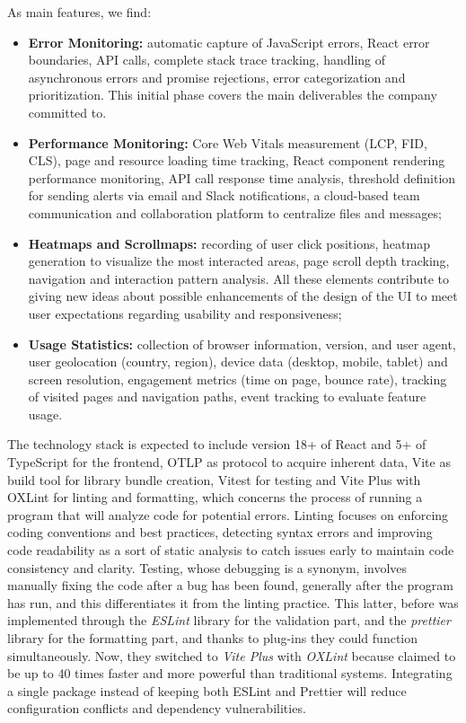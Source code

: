 \documentclass[12pt,a4paper,openright,twoside]{book}
\begin{document}
As main features, we find:
\begin{itemize}[nosep]
    \item \textbf{Error Monitoring:} automatic capture of JavaScript errors, React error boundaries, API calls, complete stack trace tracking, handling of asynchronous errors and promise rejections, error categorization and prioritization. This initial phase covers the main deliverables the company committed to.
    \item \textbf{Performance Monitoring:} Core Web Vitals measurement (LCP, FID, CLS), page and resource loading time tracking, React component rendering performance monitoring, API call response time analysis, threshold definition for sending alerts via email and Slack notifications, a cloud-based team communication and collaboration platform to centralize files and messages;
    \item \textbf{Heatmaps and Scrollmaps:} recording of user click positions, heatmap generation to visualize the most interacted areas, page scroll depth tracking, navigation and interaction pattern analysis. All these elements contribute to giving new ideas about possible enhancements of the design of the UI to meet user expectations regarding usability and responsiveness;
    \item \textbf{Usage Statistics:} collection of browser information, version, and user agent, user geolocation (country, region), device data (desktop, mobile, tablet) and screen resolution, engagement metrics (time on page, bounce rate), tracking of visited pages and navigation paths, event tracking to evaluate feature usage.
\end{itemize}

The technology stack is expected to include version 18+ of React and 5+ of TypeScript for the frontend, \ac{OTLP} as protocol to acquire inherent data, Vite as build tool for library bundle creation, Vitest for testing and Vite Plus with OXLint for linting and formatting, which concerns the process of running a program that will analyze code for potential errors. Linting focuses on enforcing coding conventions and best practices, detecting syntax errors and improving code readability as a sort of static analysis to catch issues early to maintain code consistency and clarity. Testing, whose debugging is a synonym, involves manually fixing the code after a bug has been found, generally after the program has run, and this differentiates it from the linting practice. This latter, before was implemented through the \textit{ESLint} library for the validation part, and the \textit{prettier} library for the formatting part, and thanks to plug-ins they could function simultaneously. Now, they switched to \textit{Vite Plus} with \textit{OXLint} because claimed to be up to 40 times faster and more powerful than traditional systems. Integrating a single package instead of keeping both ESLint and Prettier will reduce configuration conflicts and dependency vulnerabilities. 
\end{document}

